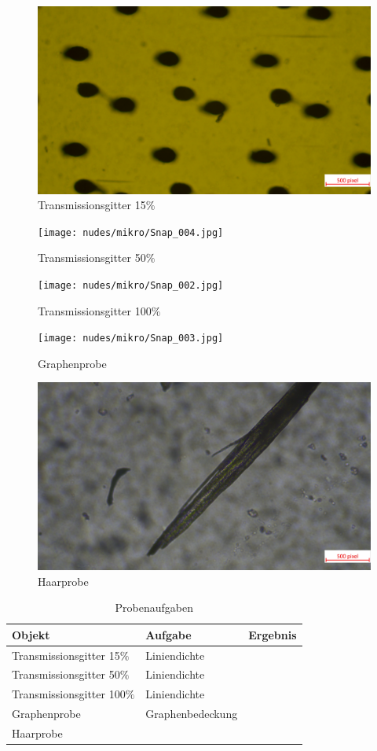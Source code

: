 \documentclass[12pt,a4paper,twoside]{article}
\begin{document}
\begin{figure}[H]
    \centering
    \includegraphics[width=0.5\linewidth, angle=0]{nudes/mikro/Snap_001.jpg}
    \caption{Transmissionsgitter 15$\%$}
    \label{fig:Transmissionsgitter15}
\end{figure}

\begin{figure}[H]
    \centering
    \texttt{[image: nudes/mikro/Snap\_004.jpg]}
    \caption{Transmissionsgitter 50$\%$}
    \label{fig:Transmissionsgitter50}
\end{figure}

\begin{figure}[H]
    \centering
    \texttt{[image: nudes/mikro/Snap\_002.jpg]}
    \caption{Transmissionsgitter 100$\%$}
    \label{fig:Transmissionsgitter100}
\end{figure}

\begin{figure}[H]
    \centering
    \texttt{[image: nudes/mikro/Snap\_003.jpg]}
    \caption{Graphenprobe}
    \label{fig:graphenprobe}
\end{figure}

\begin{figure}[H]
    \centering
    \includegraphics[width=0.5\linewidth, angle=0]{nudes/mikro/Snap_005.jpg}
    \caption{Haarprobe}
    \label{fig:haarprobe}
\end{figure}

\begin{table}[H]
    \centering
    \caption{Probenaufgaben}
    \label{tab:Probenaufgabe}
    \begin{tabular}{| l | l | l |}
        \hline
        Objekt & Aufgabe & Ergebnis \\
        \hline
        Transmissionsgitter 15$\%$ & Liniendichte &  \\
        Transmissionsgitter 50$\%$ & Liniendichte &  \\
        Transmissionsgitter 100$\%$ & Liniendichte &  \\
        Graphenprobe & Graphenbedeckung &  \\
        Haarprobe & & \\
        \hline
    \end{tabular}
\end{table}
\end{document}
